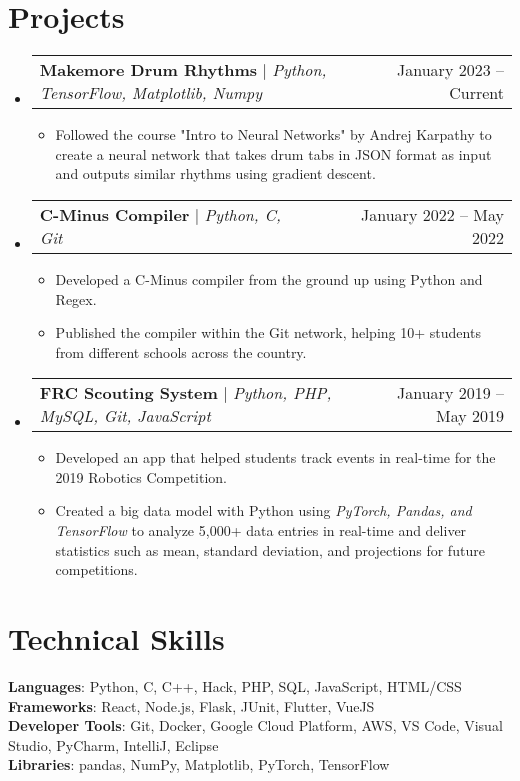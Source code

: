 \documentclass[letterpaper,11pt]{article}
\makeatletter
\newcommand{\resumeItem}[1]{
  \item\small{
    {#1 \vspace{-2pt}}
  }
}
\newcommand{\resumeProjectHeading}[2]{
    \item
    \begin{tabular*}{0.97\textwidth}{l@{\extracolsep{\fill}}r}
      \small#1 & #2 \\
    \end{tabular*}\vspace{-7pt}
}
\newcommand{\resumeSubHeadingListStart}{\begin{itemize}[leftmargin=0.15in, label={}]}
\newcommand{\resumeSubHeadingListEnd}{\end{itemize}}
\newcommand{\resumeItemListStart}{\begin{itemize}}
\newcommand{\resumeItemListEnd}{\end{itemize}\vspace{-5pt}}
\makeatother
\begin{document}
\section{Projects}
    \resumeSubHeadingListStart
      \resumeProjectHeading
          {\textbf{Makemore Drum Rhythms} $|$ \emph{Python, TensorFlow, Matplotlib, Numpy}}{January 2023 -- Current}
          \resumeItemListStart
            \resumeItem{Followed the course "Intro to Neural Networks" by Andrej Karpathy to create a neural network that takes drum tabs in JSON format as input and outputs similar rhythms using gradient descent.}
          \resumeItemListEnd
      \resumeProjectHeading
          {\textbf{C-Minus Compiler} $|$ \emph{Python, C, Git}}{January 2022 -- May 2022}
          \resumeItemListStart
            \resumeItem{Developed a C-Minus compiler from the ground up using Python and Regex.}
            \resumeItem{Published the compiler within the Git network, helping 10+ students from different schools across the country.}
          \resumeItemListEnd
      \resumeProjectHeading
          {\textbf{FRC Scouting System} $|$ \emph{Python, PHP, MySQL, Git, JavaScript}}{January 2019 -- May 2019}
          \resumeItemListStart
            \resumeItem{Developed an app that helped students track events in real-time for the 2019 Robotics Competition.}
            \resumeItem{Created a big data model with Python using \emph{PyTorch, Pandas, and TensorFlow} to analyze 5,000+ data entries in real-time and deliver statistics such as mean, standard deviation, and projections for future competitions.}
          \resumeItemListEnd
    \resumeSubHeadingListEnd

\section{Technical Skills}
 \begin{itemize}[leftmargin=0.15in, label={}]
    \small{\item{
     \textbf{Languages}{: Python, C, C++, Hack, PHP, SQL, JavaScript, HTML/CSS} \\
     \textbf{Frameworks}{: React, Node.js, Flask, JUnit, Flutter, VueJS} \\
     \textbf{Developer Tools}{: Git, Docker, Google Cloud Platform, AWS, VS Code, Visual Studio, PyCharm, IntelliJ, Eclipse} \\
     \textbf{Libraries}{: pandas, NumPy, Matplotlib, PyTorch, TensorFlow}
    }}
 \end{itemize}
\end{document}
